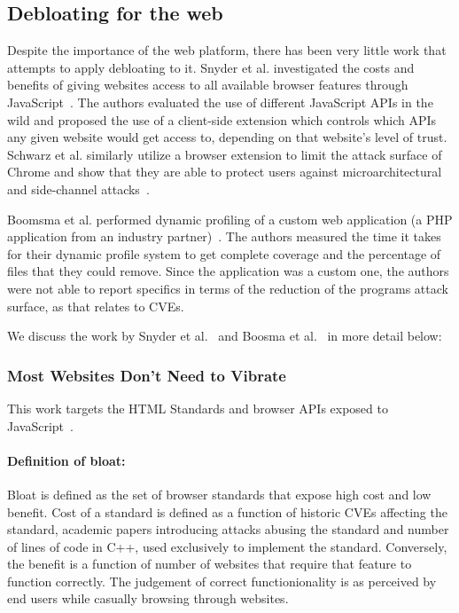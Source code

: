 \subsection{Debloating for the web}
Despite the importance of the web platform, there has been very little work that attempts to apply debloating to it. Snyder et al. investigated the costs and
benefits of giving websites access to all available browser features through
JavaScript~\cite{snyder2017vibrate}. The authors evaluated the use of different
JavaScript APIs in the wild and proposed the use of a client-side extension
which controls which APIs any given website would get access to, depending
on that website's level of trust. Schwarz et al. similarly utilize a browser
extension to limit the attack surface of Chrome and show that they are able
to protect users against microarchitectural and side-channel
attacks~\cite{Schwarz2018}. 


Boomsma et al. performed dynamic profiling of a custom web application
(a PHP application from an industry partner)~\cite{boomsma2012Dead}. The
authors measured the time it takes for their dynamic profile system to get
complete coverage and the percentage of files that they could remove. Since the
application was a custom one, the authors were not able to report specifics
in terms of the reduction of the programs attack surface, as that relates
to CVEs. 


We discuss the work by Snyder et al.~\cite{snyder2017vibrate} and Boosma et al.~\cite{boomsma2012Dead} in more detail below:

\subsubsection{Most Websites Don't Need to Vibrate}
This work targets the HTML Standards and browser APIs exposed to JavaScript~\cite{snyder2017vibrate}.
\paragraph{Definition of bloat:} Bloat is defined as the set of browser standards that expose high cost and low benefit. Cost of a standard is defined as a function of historic CVEs affecting the standard, academic papers introducing attacks abusing the standard and number of lines of code in C++, used exclusively to implement the standard. Conversely, the benefit is a function of number of websites that require that feature to function correctly. The judgement of correct functionionality is as perceived by end users while casually browsing through websites.
